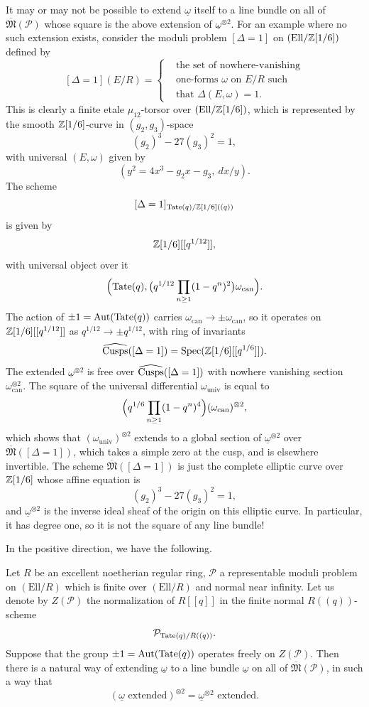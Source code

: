 \kmitem\label{item:10.13.3}
It may or may not be possible to extend $\underline{\omega}$ itself to a line bundle on all of $\overline{\mathfrak{M}}(\mathcal{P})$ whose square is the above extension of $\underline{\omega}^{\otimes 2}$. For an example where no such extension exists, consider the moduli problem $[\Delta = 1]$ on $(\mathrm{Ell}/\mathbb{Z}[1/6])$ defined by
\[
[\Delta = 1](E/R) = \left\{
\begin{aligned}
&\text{the set of nowhere-vanishing} \\
&\text{one-forms } \omega \text{ on } E/R \text{ such} \\
&\text{that } \Delta(E, \omega) = 1 .
\end{aligned}
\right.
\]
This is clearly a finite etale $\mu_{12}$-torsor over $(\mathrm{Ell}/\mathbb{Z}[1/6])$, which is represented by the smooth $\mathbb{Z}[1/6]$-curve in $(g_2, g_3)$-space
\[
(g_2)^3 - 27(g_3)^2 = 1 ,
\]
with universal $(E, \omega)$ given by
\[
(y^2 = 4x^3 - g_2 x - g_3,\ dx/y) .
\]
The scheme
\[
[\Delta = 1]_{\mathrm{Tate}(q)/\mathbb{Z}[1/6]((q))}
\]
is given by
\[
\mathbb{Z}[1/6][[q^{1/12}]] ,
\]
with universal object over it
\[
\Bigl(\mathrm{Tate}(q), \bigl(q^{1/12} \prod_{n \ge 1}(1 - q^n)^2\bigr) \omega_{\mathrm{can}}\Bigr) .
\]
The action of $\pm 1 = \operatorname{Aut}(\mathrm{Tate}(q))$ carries $\omega_{\mathrm{can}} \to \pm \omega_{\mathrm{can}}$, so it operates on $\mathbb{Z}[1/6][[q^{1/12}]]$ as $q^{1/12} \to \pm q^{1/12}$, with ring of invariants
\[
\widehat{\operatorname{Cusps}}([\Delta = 1]) = \operatorname{Spec}(\mathbb{Z}[1/6][[q^{1/6}]]) .
\]
The extended $\underline{\omega}^{\otimes 2}$ is free over $\widehat{\operatorname{Cusps}}([\Delta = 1])$ with nowhere vanishing section $\omega_{\mathrm{can}}^{\otimes 2}$. The square of the universal differential $\omega_{\mathrm{univ}}$ is equal to
\[
\Bigl(q^{1/6} \prod_{n \ge 1}(1 - q^n)^4\Bigr) (\omega_{\mathrm{can}})^{\otimes 2} ,
\]
which shows that $(\omega_{\mathrm{univ}})^{\otimes 2}$ extends to a global section of $\underline{\omega}^{\otimes 2}$ over $\overline{\mathfrak{M}}([\Delta = 1])$, which takes a simple zero at the cusp, and is elsewhere invertible. The scheme $\overline{\mathfrak{M}}([\Delta = 1])$ is just the complete elliptic curve over $\mathbb{Z}[1/6]$ whose affine equation is
\[
(g_2)^3 - 27(g_3)^2 = 1 ,
\]
and $\underline{\omega}^{\otimes 2}$ is the inverse ideal sheaf of the origin on this elliptic curve. In particular, it has degree one, so it is not the square of any line bundle!

In the positive direction, we have the following.

\begin{kprop}\label{prop:10.13.4}
Let $R$ be an excellent noetherian regular ring, $\mathcal{P}$ a representable moduli problem on $(\mathrm{Ell}/R)$ which is finite over $(\mathrm{Ell}/R)$ and normal near infinity. Let us denote by $Z(\mathcal{P})$ the normalization of $R[[q]]$ in the finite normal $R((q))$-scheme
\[
\mathcal{P}_{\mathrm{Tate}(q)/R((q))} .
\]
Suppose that the group $\pm 1 = \operatorname{Aut}(\mathrm{Tate}(q))$ operates freely on $Z(\mathcal{P})$. Then there is a natural way of extending $\underline{\omega}$ to a line bundle $\underline{\omega}$ on all of $\overline{\mathfrak{M}}(\mathcal{P})$, in such a way that
\[
(\underline{\omega}\text{ extended})^{\otimes 2} = \underline{\omega}^{\otimes 2}\text{ extended} .
\]
\end{kprop}

